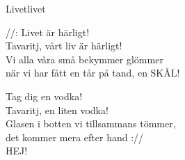 \begin{song}{Livet}{livet}
\begin{vers}
//: Livet är härligt!\\
Tavaritj, vårt liv är härligt!\\
Vi alla våra små bekymmer glömmer\\
när vi har fått en tår på tand, en SKÅL!\\
\end{vers}
\begin{vers}
Tag dig en vodka!\\
Tavaritj, en liten vodka!\\
Glasen i botten vi tillsammans tömmer,\\
det kommer mera efter hand ://\\
HEJ!\\
\end{vers}
\end{song}
